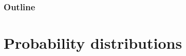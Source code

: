 \newcommand{\ensuretext}[1]{\ensuremath{\text{#1}}}
\def\ie{\ensuretext{\textit{i.e.,\xspace}}}
\def\eg{\ensuretext{\textit{e.g.,\xspace}}}

\newcommand{\uder}[2]{\frac{\partial #1}{\partial #2}}
\newcommand{\C}{\ensuremath{\mathbb{C}}}
\newcommand{\CP}{\ensuremath{\mathbb{CP}}}
\newcommand{\GL}[1]{\ensuremath{\mathrm{GL}(#1)}}
\newcommand{\SL}[1]{\ensuremath{\mathrm{SL}(#1)}}
\newcommand{\Q}{\ensuremath{\mathbb{Q}}}
\newcommand{\R}{\ensuremath{\mathbb{R}}}
\newcommand{\RP}{\ensuremath{\mathbb{RP}}}
\newcommand{\Z}{\ensuremath{\mathbb{Z}}}
\newcommand{\med}{\ensuremath{\mathop{\mathrm{med}}}}
\newcommand{\uPr}{\ensuremath{\mathop{\mathrm{Pr}}}}
\newcommand{\uE}{\ensuremath{\mathrm{E}}}
\newcommand{\ucov}[2]{\ensuremath{\mathop{\mathrm{cov}}\left(#1 ,\, #2\right)}}
\newcommand{\ucor}[2]{\ensuremath{\mathop{\mathrm{corr}}\left(#1 ,\, #2\right)}}
\newcommand{\ucorr}[2]{\ensuremath{\mathop{\mathrm{corr}}\left(#1 ,\, #2\right)}}
\newcommand{\uvar}{\ensuremath{\mathop{\mathrm{var}}}}
\newcommand{\ud}{\ensuremath{\mathrm{d}}}
\newcommand{\uProj}{\ensuremath{\mathop{\mathrm{Proj}}}}
\newcommand{\uimply}{\ensuremath{\;\Longrightarrow\;}}
\newcommand{\uequiv}{\ensuremath{\;\Longleftrightarrow\;}}
\newcommand{\uforall}{\textrm{ for all }}
\newcommand{\us}[1]{\ensuremath{\mathrm{Sym}(#1)}}
\newcommand{\uo}[2]{\mathrm{Orb}_{#1}(#2)}
\newcommand{\ustab}[1]{\mathrm{Stab}(#1)}
\newcommand{\uinner}[2]{\ensuremath{\langle #1 ,\; #2 \rangle}}
\newcommand{\urepeat}[2]{%
  \setcounter{myN}{0}
  \whiledo{\value{myN} < #1}{%
    \stepcounter{myN}#2}}
\newcommand{\uvec}[2][n]{\ensuremath{#2_1, \cdots, #2_{#1}}}
\newcommand{\umark}[1]{\marginpar{%
    \vskip-\baselineskip %
    \raggedright\footnotesize
    \itshape\hrule\smallskip#1\par\smallskip\hrule}}






\begin{frame}
  \titlepage
\end{frame}

\begin{frame}
  \frametitle{Outline}
  \tableofcontents
\end{frame}


\section{Probability distributions}

